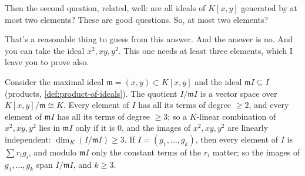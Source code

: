 \begin{speech}[00:01:19 - 00:02:03]
Then the second question, related, well: are all ideals  of $K[x, y]$  generated by at most two elements?  These are good questions.  So, at most two elements?

That's a reasonable thing to guess from this answer. And the answer is no.  And you can take the ideal  $x^2, xy, y^2$. This one needs at least three elements, which I leave you to prove also.
\end{speech}

\begin{content}


\begin{steps}
Consider the maximal ideal $\mathfrak{m} = (x, y) \subset K[x, y]$ and the ideal $\mathfrak{m}I \subseteq I$ (products, \cref{def:product-of-ideals}). The quotient $I / \mathfrak{m}I$ is a vector space over $K[x, y]/\mathfrak{m} \cong K$. Every element of $I$ has all its terms of degree $\ge 2$, and every element of $\mathfrak{m}I$ has all its terms of degree $\ge 3$; so a $K$-linear combination of $x^2, xy, y^2$ lies in $\mathfrak{m}I$ only if it is $0$, and the images of $x^2, xy, y^2$ are linearly independent: $\dim_K(I / \mathfrak{m}I) \ge 3$. If $I = (g_1, \dots, g_k)$, then every element of $I$ is $\sum r_i g_i$, and modulo $\mathfrak{m}I$ only the constant terms of the $r_i$ matter; so the images of $g_1, \dots, g_k$ span $I / \mathfrak{m}I$, and $k \ge 3$.
\end{steps}
\end{content}

